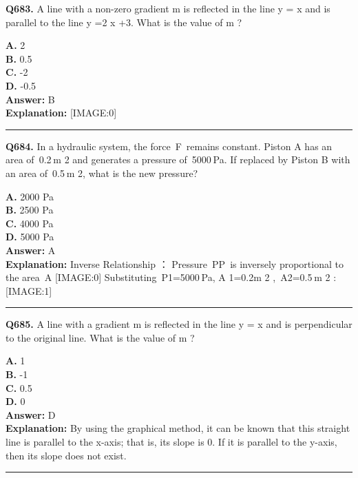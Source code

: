 \documentclass[12pt]{article}
\begin{document}
\noindent
\textbf{Q683.} A line with a non-zero gradient
m
is reflected in the line
y
=
x
and is parallel to the line
y
=2
x
+3. What is the value of
m
?



\textbf{A.} 2 \\
\textbf{B.} 0.5 \\
\textbf{C.} -2 \\
\textbf{D.} -0.5 \\

\textbf{Answer:} B \\
\textbf{Explanation:} [IMAGE:0]

\hrule
\vspace{1em}


\noindent
\textbf{Q684.} In a hydraulic system, the force F remains constant. Piston A has an area of 0.2 m
2
and generates a pressure of 5000 Pa. If replaced by Piston B with an area of 0.5 m
2,
what is the new pressure?



\textbf{A.} 2000 Pa \\
\textbf{B.} 2500 Pa \\
\textbf{C.} 4000 Pa \\
\textbf{D.} 5000 Pa \\

\textbf{Answer:} A \\
\textbf{Explanation:} Inverse Relationship
：
Pressure PP is inversely proportional to the area A
[IMAGE:0]
Substituting P1=5000 Pa,
A
1​=0.2m
2
, A2=0.5 m
2
:
[IMAGE:1]

\hrule
\vspace{1em}


\noindent
\textbf{Q685.} A line with a gradient
m
is reflected in the line
y
=
x
and is perpendicular to the original line. What is the value of
m
?



\textbf{A.} 1 \\
\textbf{B.} -1 \\
\textbf{C.} 0.5 \\
\textbf{D.} 0 \\

\textbf{Answer:} D \\
\textbf{Explanation:} By using the graphical method, it can be known that this straight line is parallel to the x-axis; that is, its slope is 0. If it is parallel to the y-axis, then its slope does not exist.

\hrule
\vspace{1em}
\end{document}

